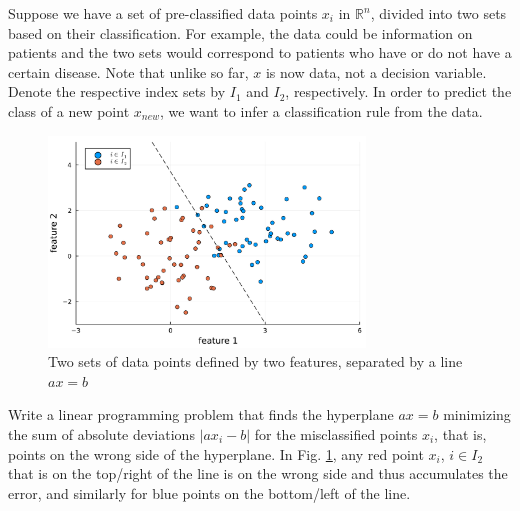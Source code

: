 Suppose we have a set of pre-classified data points $x_i$ in $\mathbb{R}^n$, divided into two sets based on their classification. For example, the data could be information on patients and the two sets would correspond to patients who have or do not have a certain disease. Note that unlike so far, $x$ is now data, not a decision variable. Denote the respective index sets by $I_1$ and $I_2$, respectively. In order to predict the class of a new point $x_{new}$, we want to infer a classification rule from the data.
\begin{figure}
    \includegraphics[width=0.75\textwidth]{part_1/chapter_1/figures/figure_e16.pdf}
    \caption{Two sets of data points defined by two features, separated by a line $ax=b$} \label{p1c1:fig:fig_e16}		
\end{figure}

Write a linear programming problem that finds the hyperplane $ax = b$ minimizing the sum of absolute deviations $|ax_i-b|$ for the misclassified points $x_i$, that is, points on the wrong side of the hyperplane. In Fig. \ref{p1c1:fig:fig_e16}, any red point $x_i$, $i \in I_2$ that is on the top/right of the line is on the wrong side and thus accumulates the error, and similarly for blue points on the bottom/left of the line.
